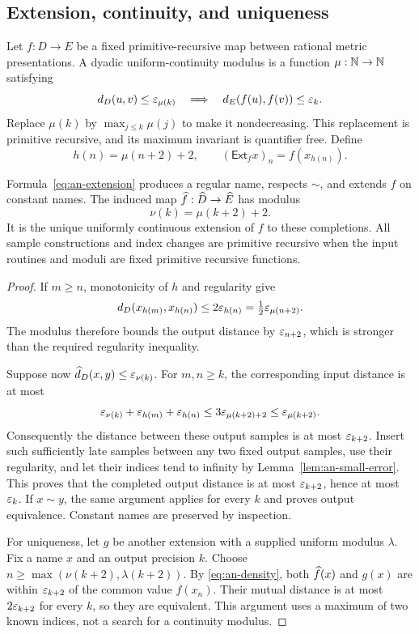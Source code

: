 \subsection{Extension, continuity, and uniqueness}

Let $f:D\to E$ be a fixed primitive-recursive map between rational
metric presentations.  A dyadic uniform-continuity modulus is a function
$\mu:\mathbb N\to\mathbb N$ satisfying
\begin{equation}
 d_D(u,v)\le\varepsilon_{\mu(k)}
 \quad\Longrightarrow\quad
 d_E(f(u),f(v))\le\varepsilon_k.
 \label{eq:an-map-modulus}
\end{equation}
Replace $\mu(k)$ by $\max_{j\le k}\mu(j)$ to make it nondecreasing.
This replacement is primitive recursive, and its maximum invariant is
quantifier free.  Define
\begin{equation}
 h(n)=\mu(n+2)+2,
 \qquad (\mathsf{Ext}_f x)_n=f(x_{h(n)}).
 \label{eq:an-extension}
\end{equation}

\begin{theorem}
\label{thm:an-extension}
Formula~\eqref{eq:an-extension} produces a regular name, respects
$\sim$, and extends $f$ on constant names.  The induced map
$\widehat f:\widehat D\to\widehat E$ has modulus
\[
 \nu(k)=\mu(k+2)+2.
\]
It is the unique uniformly continuous extension of $f$ to these
completions.  All sample constructions and index changes are primitive
recursive when the input routines and moduli are fixed primitive
recursive functions.
\end{theorem}

\begin{proof}
If $m\ge n$, monotonicity of $h$ and regularity give
\[
 d_D(x_{h(m)},x_{h(n)})
 \le2\varepsilon_{h(n)}
 =\tfrac12\varepsilon_{\mu(n+2)}.
\]
The modulus therefore bounds the output distance by $\varepsilon_{n+2}$,
which is stronger than the required regularity inequality.

Suppose now $\widehat d_D(x,y)\le\varepsilon_{\nu(k)}$.  For $m,n\ge k$,
the corresponding input distance is at most
\[
 \varepsilon_{\nu(k)}+\varepsilon_{h(m)}+\varepsilon_{h(n)}
 \le 3\varepsilon_{\mu(k+2)+2}
 \le\varepsilon_{\mu(k+2)}.
\]
Consequently the distance between these output samples is at most
$\varepsilon_{k+2}$.  Insert such sufficiently late samples between any two
fixed output samples, use their regularity, and let their indices tend
to infinity by Lemma~\ref{lem:an-small-error}.  This proves that the
completed output distance is at most $\varepsilon_{k+2}$, hence at most
$\varepsilon_k$.  If $x\sim y$, the same argument applies for every $k$ and
proves output equivalence.  Constant names are preserved by inspection.

For uniqueness, let $g$ be another extension with a supplied uniform
modulus $\lambda$.  Fix a name $x$ and an output precision $k$.
Choose
$n\ge\max(\nu(k+2),\lambda(k+2))$.  By
\eqref{eq:an-density}, both $\widehat f(x)$ and $g(x)$ are within
$\varepsilon_{k+2}$ of the common value $f(x_n)$.  Their mutual distance is
at most $2\varepsilon_{k+2}$ for every $k$, so they are equivalent.
This argument uses a maximum of two known indices, not a search for a
continuity modulus.
\end{proof}


